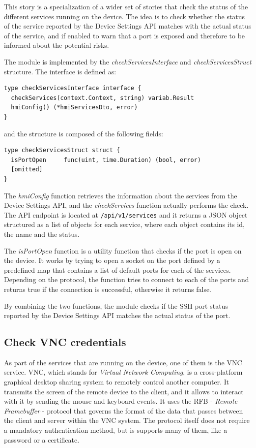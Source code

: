 This story is a specialization of a wider set of stories that check the status of the different services running on the device. The idea is to check whether the status of the service reported by the Device Settings API matches with the actual status of the service, and if enabled to warn that a port is exposed and therefore to be informed about the potential risks.

The module is implemented by the \textit{checkServicesInterface} and \textit{checkServicesStruct} structure. The interface is defined as:

\begin{lstlisting}[style=golang]
type checkServicesInterface interface {
  checkServices(context.Context, string) variab.Result
  hmiConfig() (*hmiServicesDto, error)
}
\end{lstlisting}

and the structure is composed of the following fields:

\begin{lstlisting}[style=golang]
type checkServicesStruct struct {
  isPortOpen     func(uint, time.Duration) (bool, error)
  [omitted]
}
\end{lstlisting}

The \textit{hmiConfig} function retrieves the information about the services from the Device Settings API, and the \textit{checkServices} function actually performs the check. The API endpoint is located at \texttt{/api/v1/services} and it returns a JSON object structured as a list of objects for each service, where each object contains its id, the name and the status.

The \textit{isPortOpen} function is a utility function that checks if the port is open on the device. It works by trying to open a socket on the port defined by a predefined map that contains a list of default ports for each of the services. Depending on the protocol, the function tries to connect to each of the ports and returns true if the connection is successful, otherwise it returns false.

By combining the two functions, the module checks if the SSH port status reported by the Device Settings API matches the actual status of the port.

\subsection{Check VNC credentials}

As part of the services that are running on the device, one of them is the VNC service. VNC, which stands for \textit{Virtual Network Computing}, is a cross-platform graphical desktop sharing system to remotely control another computer. It transmits the screen of the remote device to the client, and it allows to interact with it by sending the mouse and keyboard events. It uses the RFB - \textit{Remote Framebuffer} - protocol that governs the format of the data that passes between the client and server within the VNC system. The protocol itself does not require a mandatory authentication method, but is supports many of them, like a password or a certificate.

